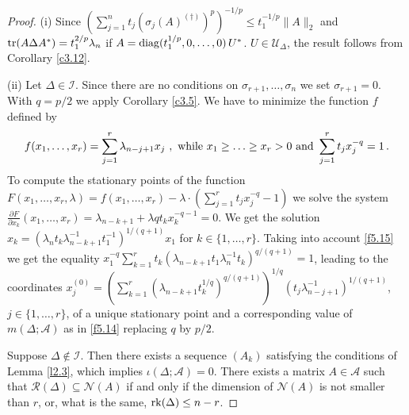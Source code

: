 \documentclass{amsart}
\begin{document}
\begin{proof}
(i) Since $(\sum_{j=1}^n t_j (\sigma_j(A)^{(\dagger)})^p)^{-1/p} \leq t_1^{-1/p} \| A \|_2$ and ${\rm tr}(A \Delta A^*)=t_1^{2/p} \lambda_n$ if $A={\rm diag}(t_1^{1/p},0,\ldots,0) \, U^*$. $U \in {\mathcal U}_\Delta$, the result follows from Corollary \ref{c3.12}.

(ii) Let $\Delta \in {\mathcal I}$. Since there are no conditions on $\sigma_{r+1},\ldots,\sigma_n$ we set $\sigma_{r+1}=0$. With $q=p/2$ we apply Corollary \ref{c3.5}. We have to minimize the function $f$ defined by
     \begin{equation} \label{f5.15}
           f(x_1,\ldots,x_r) = \sum_{j=1}^r \lambda_{n-j+1} x_j \,\, , \,\, {\rm while} \,\, x_1 \geq \ldots \geq x_r > 0 \,\, {\rm and} \,\, \sum_{j=1}^r t_j x_j^{-q}=1 \, .
     \end{equation}
To compute the stationary points of the function $F(x_1,\ldots,x_r,\lambda) = f(x_1,\ldots,x_r) - \lambda \cdot (\sum_{j=1}^r t_j x_j^{-q} - 1 )$ we solve the system $\frac{{\partial} F}{{\partial} x_k} (x_1,\ldots,x_r) = \lambda_{n-k+1} + \lambda q t_kx_k^{-q-1} =0$. We get the solution $x_k = (\lambda_n t_k \lambda_{n-k+1}^{-1}t_1^{-1})^{1/(q+1)}x_1$ for $k \in \{ 1,\ldots,r\}$. Taking into account \eqref{f5.15} we get the equality $x_1^{-q} \sum_{k=1}^r t_k(\lambda_{n-k+1}t_1 \lambda_n^{-1}t_k)^{q/(q+1)} = 1$, leading to the coordinates $x_j^{(0)} = \left( \sum_{k=1}^r (\lambda_{n-k+1} t_k^{1/q} )^{q / (q+1)} \right)^{1/q} (t_j\lambda_{n-j+1}^{-1})^{1/(q+1)}$, $j \in \{ 1,\ldots,r \}$, of a unique stationary point and a corresponding value of $m(\Delta ; {\mathcal A})$ as in \eqref{f5.14} replacing $q$ by $p/2$. 

Suppose $\Delta \not\in {\mathcal I}$. Then there exists a sequence $(A_k)$ satisfying the conditions of Lemma \ref{l2.3}, which implies $\iota(\Delta ; {\mathcal A})=0$. There exists a matrix $A \in {\mathcal A}$ such that ${\mathcal R}(\Delta) \subseteq  {\mathcal N}(A)$ if and only if the dimension of ${\mathcal N}(A)$ is not smaller than $r$, or, what is the same, ${\rm rk}(\Delta) \leq n-r$.
\end{proof}
\end{document}
